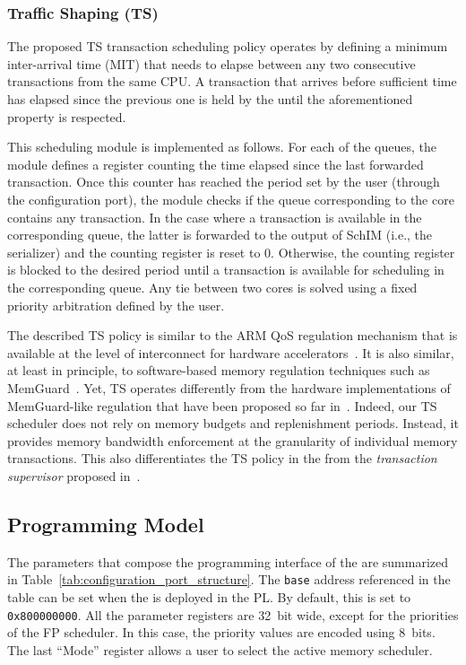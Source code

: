\subsubsection{Traffic Shaping (TS)}
The proposed TS transaction scheduling policy operates by defining a
minimum inter-arrival time (MIT) that needs to elapse between any two
consecutive transactions from the same CPU. A transaction that arrives
before sufficient time has elapsed since the previous one is held by
the \schim until the aforementioned property is respected.

This scheduling module is implemented as follows. For each of the
\schim queues, the module defines a register counting the time elapsed
since the last forwarded transaction. Once this counter has reached
the period set by the user (through the configuration port), the
module checks if the queue corresponding to the core contains any
transaction. In the case where a transaction is available in the
corresponding queue, the latter is forwarded to the output of SchIM
(i.e., the serializer) and the counting register is reset to
0. Otherwise, the counting register is blocked to the desired period
until a transaction is available for scheduling in the corresponding
queue. Any tie between two cores is solved using a fixed priority
arbitration defined by the user.

The described TS policy is similar to the ARM QoS regulation mechanism
that is available at the level of interconnect for hardware
accelerators~\cite{qos-400, ewarp2020rtss}. It is also similar, at
least in principle, to software-based memory regulation techniques
such as MemGuard~\cite{memguard2013}. Yet, TS operates differently
from the hardware implementations of MemGuard-like regulation that
have been proposed so far in~\cite{zhou2016mitts,
  Farshchi2020BRUBR}. Indeed, our TS scheduler does not rely on memory
budgets and replenishment periods. Instead, it provides memory
bandwidth enforcement at the granularity of individual memory
transactions. This also differentiates the TS policy in the \schim
from the \emph{transaction supervisor} proposed
in~\cite{fred_hyperconnect}.
\color{black}

\subsection{Programming Model}
The parameters that compose the programming interface of the \schim
are summarized in Table~\ref{tab:configuration_port_structure}. The
\texttt{base} address referenced in the table can be set when the
\schim is deployed in the PL. By default, this is set to
\texttt{0x800000000}. All the parameter registers are 32~bit wide,
except for the priorities of the FP scheduler. In this case, the
priority values are encoded using 8~bits. The last ``Mode'' register
allows a user to select the active memory scheduler.

